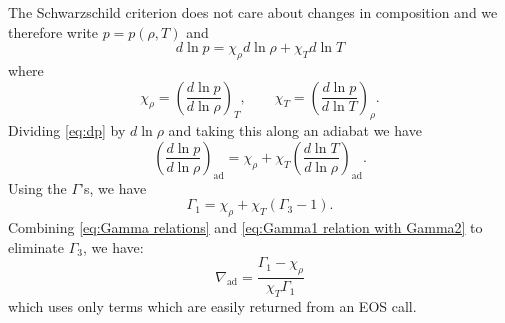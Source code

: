 The Schwarzschild criterion does not care about changes in composition
and we therefore write $p = p(\rho,T)$ and
\begin{equation}\label{eq:dp}
  d\ln p = \chi_\rho d\ln\rho + \chi_T d\ln T
\end{equation}
where
\[
\chi_\rho = \left(\frac{d\ln p}{d\ln\rho}\right)_T,\qquad
\chi_T = \left(\frac{d\ln p}{d\ln T}\right)_\rho.
\]
Dividing \eqref{eq:dp} by $d\ln\rho$ and taking this along an adiabat
we have
\begin{equation}\label{eq:dp2}
  \left(\frac{d\ln p}{d\ln\rho}\right)_\text{ad} = \chi_\rho + \chi_T
  \left(\frac{d\ln T}{d\ln\rho}\right)_\text{ad}.
\end{equation}
Using the $\Gamma$'s, we have
\begin{equation}\label{eq:Gamma1 relation with Gamma2}
  \Gamma_1 = \chi_\rho + \chi_T\left(\Gamma_3-1\right).
\end{equation}
Combining \eqref{eq:Gamma relations} and \eqref{eq:Gamma1 relation
  with Gamma2} to eliminate $\Gamma_3$, we have:
\begin{equation}\label{eq:nabla_ad}
  \nabla_\text{ad} = \frac{\Gamma_1 - \chi_\rho}{\chi_T\Gamma_1}
\end{equation}
which uses only terms which are easily returned from an EOS call.


